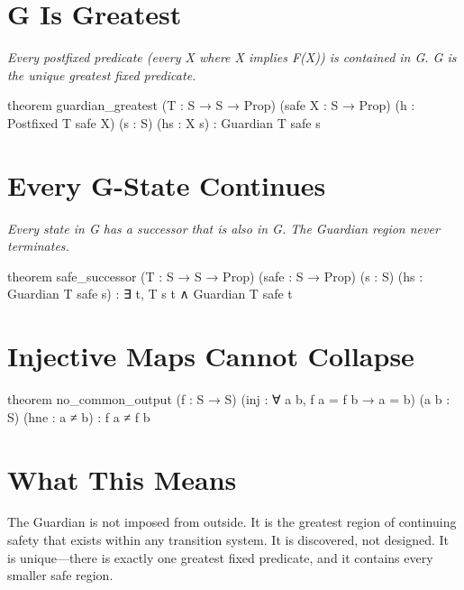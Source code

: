 \axiombadge

\section{G Is Greatest}

\begin{theorembox}
\itshape Every postfixed predicate (every X where X implies F(X)) is contained in G. G is the unique greatest fixed predicate.
\end{theorembox}

\begin{leancode}
theorem guardian_greatest (T : S → S → Prop)
     (safe X : S → Prop) (h : Postfixed T safe X)
     (s : S) (hs : X s) : Guardian T safe s
\end{leancode}

\axiombadge

\section{Every G-State Continues}

\begin{theorembox}
\itshape Every state in G has a successor that is also in G. The Guardian region never terminates.
\end{theorembox}

\begin{leancode}
theorem safe_successor (T : S → S → Prop)
     (safe : S → Prop) (s : S)
     (hs : Guardian T safe s) :
     ∃ t, T s t ∧ Guardian T safe t
\end{leancode}

\axiombadge

\section{Injective Maps Cannot Collapse}

\begin{leancode}
theorem no_common_output (f : S → S)
     (inj : ∀ a b, f a = f b → a = b)
     (a b : S) (hne : a ≠ b) : f a ≠ f b
\end{leancode}

\axiombadge

\section{What This Means}

The Guardian is not imposed from outside. It is the greatest region of continuing safety that exists within any transition system. It is discovered, not designed. It is unique—there is exactly one greatest fixed predicate, and it contains every smaller safe region.

